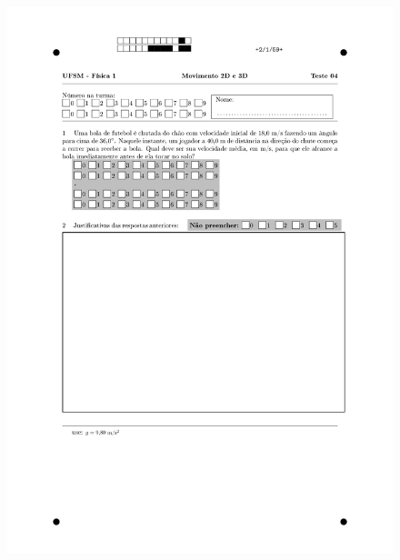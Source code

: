 \begin{figure}[H]\centering
\includegraphics[scale=0.7]{fig/orp1q3_page-0002.jpg}
\end{figure}
\vspace*{\fill}
